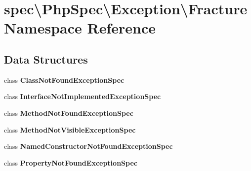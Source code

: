 \section{spec\textbackslash{}Php\+Spec\textbackslash{}Exception\textbackslash{}Fracture Namespace Reference}
\label{namespacespec_1_1_php_spec_1_1_exception_1_1_fracture}
\subsection*{Data Structures}
\begin{DoxyCompactItemize}
\item 
class {\bf Class\+Not\+Found\+Exception\+Spec}
\item 
class {\bf Interface\+Not\+Implemented\+Exception\+Spec}
\item 
class {\bf Method\+Not\+Found\+Exception\+Spec}
\item 
class {\bf Method\+Not\+Visible\+Exception\+Spec}
\item 
class {\bf Named\+Constructor\+Not\+Found\+Exception\+Spec}
\item 
class {\bf Property\+Not\+Found\+Exception\+Spec}
\end{DoxyCompactItemize}
